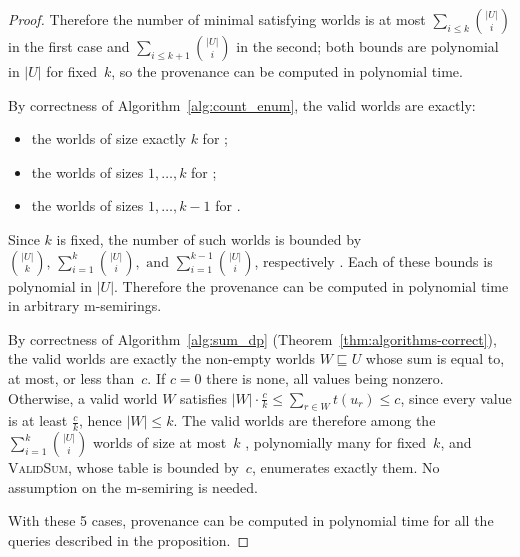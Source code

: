 \begin{proof}
Therefore the number of minimal satisfying worlds is at most
$\sum_{i\le k}\binom{|U|}{i}$ in the first case
 and
$\sum_{i\le k+1}\binom{|U|}{i}$ in the second; both bounds are polynomial
in $|U|$ for fixed~$k$, so the provenance can be computed in polynomial
time.

By correctness of Algorithm~\ref{alg:count_enum}, the valid worlds are exactly:
\begin{itemize}
\item the worlds of size exactly $k$ for ;
\item the worlds of sizes $1,\dots,k$ for ;
\item the worlds of sizes $1,\dots,k-1$ for .
\end{itemize}
Since $k$ is fixed, the number of such worlds is bounded by
  $\binom{|U|}{k},\, \sum_{i=1}^{k}\binom{|U|}{i},\text{ and } \sum_{i=1}^{k-1}\binom{|U|}{i}$, respectively . Each of these bounds is polynomial in $|U|$. Therefore the provenance can be computed in polynomial time in arbitrary m-semirings.

By correctness of Algorithm~\ref{alg:sum_dp}
(Theorem~\ref{thm:algorithms-correct}), the valid worlds are exactly the
non-empty worlds $W\sqsubseteq U$ whose sum is equal to, at most, or less
than~$c$. If $c=0$ there is none, all values being nonzero. Otherwise, a
valid world $W$ satisfies $|W|\cdot\frac ck\le\sum_{r\in W}t(u_r)\le c$,
since every value is at least $\frac ck$, hence $|W|\le k$. The valid
worlds are therefore among the $\sum_{i=1}^{k}\binom{|U|}{i}$ worlds of
size at most~$k$ ,
polynomially many for fixed~$k$, and \textsc{ValidSum}, whose table is
bounded by~$c$, enumerates exactly them. No assumption on the m-semiring
is needed.

\smallskip\noindent
With these 5 cases, provenance can be computed in polynomial time for all the  queries described in the proposition.
\end{proof}
